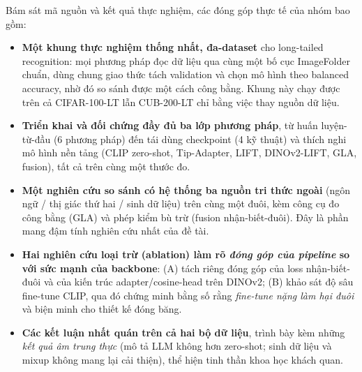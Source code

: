 Bám sát mã nguồn và kết quả thực nghiệm, các đóng góp thực tế của nhóm bao gồm:
\begin{itemize}
  \item \textbf{Một khung thực nghiệm thống nhất, đa-dataset} cho long-tailed recognition: mọi phương
        pháp đọc dữ liệu qua cùng một bố cục ImageFolder chuẩn, dùng chung giao thức tách validation
        và chọn mô hình theo balanced accuracy, nhờ đó so sánh được một cách công bằng. Khung này chạy
        được trên cả CIFAR-100-LT lẫn CUB-200-LT chỉ bằng việc thay nguồn dữ liệu.
  \item \textbf{Triển khai và đối chứng đầy đủ ba lớp phương pháp}, từ huấn luyện-từ-đầu (6 phương
        pháp) đến tái dùng checkpoint (4 kỹ thuật) và thích nghi mô hình nền tảng (CLIP zero-shot,
        Tip-Adapter, LIFT, DINOv2-LIFT, GLA, fusion), tất cả trên cùng một thước đo.
  \item \textbf{Một nghiên cứu so sánh có hệ thống ba nguồn tri thức ngoài} (ngôn ngữ / thị giác thứ
        hai / sinh dữ liệu) trên cùng một đuôi, kèm công cụ đo công bằng (GLA) và phép kiểm bù trừ
        (fusion nhận-biết-đuôi). Đây là phần mang đậm tính nghiên cứu nhất của đề tài.
  \item \textbf{Hai nghiên cứu loại trừ (ablation) làm rõ \emph{đóng góp của pipeline} so với sức
        mạnh của backbone}: (A) tách riêng đóng góp của loss nhận-biết-đuôi và của kiến trúc
        adapter/cosine-head trên DINOv2; (B) khảo sát độ sâu fine-tune CLIP, qua đó chứng minh bằng
        số rằng \emph{fine-tune nặng làm hại đuôi} và biện minh cho thiết kế đóng băng.
  \item \textbf{Các kết luận nhất quán trên cả hai bộ dữ liệu}, trình bày kèm những \emph{kết quả âm
        trung thực} (mô tả LLM không hơn zero-shot; sinh dữ liệu và mixup không mang lại cải thiện),
        thể hiện tinh thần khoa học khách quan.
\end{itemize}

